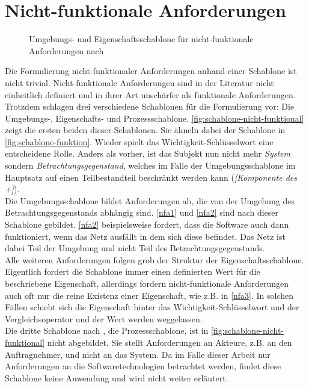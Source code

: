 \section{Nicht-funktionale Anforderungen}
\label{sec:nicht-funktionale}

\begin{figure}
    \centering
    
    
    \caption{Umgebungs- und Eigenschaftsschablone für nicht-funktionale Anforderungen nach }
    \label{fig:schablone-nicht-funktional}
\end{figure}

Die Formulierung nicht-funktionaler Anforderungen anhand einer Schablone ist nicht trivial. Nicht-funktionale
Anforderungen sind in der Literatur nicht einheitlich definiert und in ihrer Art unschärfer als funktionale
Anforderungen. Trotzdem schlagen  drei verschiedene Schablonen für die Formulierung
vor: Die Umgebungs-, Eigenschafts- und Prozessschablone. \autoref{fig:schablone-nicht-funktional} zeigt
die ersten beiden dieser Schablonen. Sie ähneln dabei der Schablone in \autoref{fig:schablone-funktion}.
Wieder spielt das Wichtigkeit-Schlüsselwort eine entscheidene Rolle. Anders als vorher, ist das Subjekt nun 
nicht mehr \emph{System} sondern \emph{Betrachtungsgegenstand}, welches im Falle der Umgebungsschablone
im Hauptsatz auf einen Teilbestandteil beschränkt werden kann (\emph{[Komponente des +]}).\\
Die Umgebungsschablone bildet Anforderungen ab, die von der Umgebung 
des Betrachtungsgegenstands abhängig sind. \ref{nfa1} und \ref{nfa2} sind nach dieser Schablone gebildet.
\ref{nfa2} beispielsweise fordert, dass die Software auch dann funktioniert, wenn das Netz ausfällt in dem 
sich diese befindet. Das Netz ist dabei Teil der Umgebung und nicht Teil des Betrachtungsgegenstands.\\
Alle weiteren Anforderungen folgen grob der Struktur der Eigenschaftsschablone. Eigentlich fordert die 
Schablone immer einen definierten Wert für die beschriebene Eigenschaft, allerdings fordern nicht-funktionale
Anforderungen auch oft nur die reine Existenz einer Eigenschaft, wie z.B. in \ref{nfa3}.
In solchen Fällen schiebt sich die Eigenschaft hinter das 
Wichtigkeit-Schlüsselwort und der Vergleichsoperator und der Wert werden weggelassen.\\
Die dritte Schablone nach , die Prozessschablone, ist in \autoref{fig:schablone-nicht-funktional}
nicht abgebildet. Sie stellt Anforderungen an Akteure, z.B. an den Auftragnehmer, und nicht an das System.
Da im Falle dieser Arbeit nur Anforderungen an die Softwaretechnologien betrachtet werden, findet diese Schablone 
keine Anwendung und wird nicht weiter erläutert.\\

